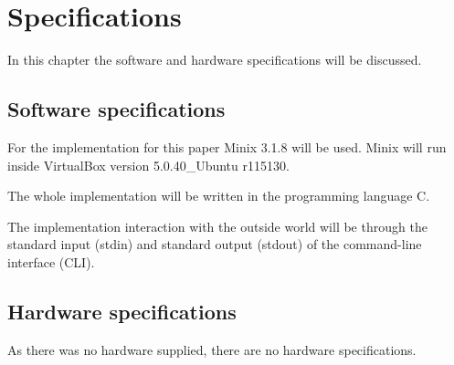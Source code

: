\hypertarget{specifications}{%
\chapter{Specifications}\label{specifications}}

In this chapter the software and hardware specifications will be
discussed.

\hypertarget{software-specifications}{%
\section{Software specifications}\label{software-specifications}}

For the implementation for this paper Minix 3.1.8 will be used. Minix
will run inside VirtualBox version 5.0.40\_Ubuntu r115130.

The whole implementation will be written in the programming language C.

The implementation interaction with the outside world will be through
the standard input (stdin) and standard output (stdout) of the
command-line interface (CLI).

\hypertarget{hardware-specifications}{%
\section{Hardware specifications}\label{hardware-specifications}}

As there was no hardware supplied, there are no hardware specifications.
